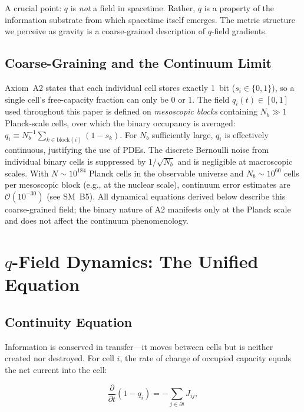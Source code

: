 \documentclass[aps,prd,twocolumn,showpacs,superscriptaddress,preprintnumbers]{revtex4-2}
\begin{document}
A crucial point: $q$ is \emph{not} a field in spacetime.
Rather, $q$ is a property of the information substrate from which spacetime itself emerges.
The metric structure we perceive as gravity is a coarse-grained description of $q$-field gradients.

\subsection{Coarse-Graining and the Continuum Limit}

Axiom~A2 states that each individual cell stores exactly 1~bit ($s_i\in\{0,1\}$), so a single cell's free-capacity fraction can only be 0 or 1.
The field $q_i(t)\in[0,1]$ used throughout this paper is defined on \emph{mesoscopic blocks} containing $N_b\gg 1$ Planck-scale cells, over which the binary occupancy is averaged:
$q_i \equiv N_b^{-1}\sum_{k\in\text{block}(i)}(1-s_k)$.
For $N_b$ sufficiently large, $q_i$ is effectively continuous, justifying the use of PDEs.
The discrete Bernoulli noise from individual binary cells is suppressed by $1/\sqrt{N_b}$ and is negligible at macroscopic scales.
With $N\sim10^{184}$ Planck cells in the observable universe and $N_b\sim10^{60}$ cells per mesoscopic block (e.g., at the nuclear scale), continuum error estimates are $\mathcal{O}(10^{-30})$ (see SM~B5).
All dynamical equations derived below describe this coarse-grained field; the binary nature of A2 manifests only at the Planck scale and does not affect the continuum phenomenology.

\section{$q$-Field Dynamics: The Unified Equation}
\label{sec:dynamics}

\subsection{Continuity Equation}

Information is conserved in transfer---it moves between cells but is neither created nor destroyed.
For cell $i$, the rate of change of occupied capacity equals the net current into the cell:

\begin{equation}
\frac{\partial}{\partial t}(1 - q_i) = -\sum_{j \in \partial i} J_{ij},
\label{eq:continuity_raw}
\end{equation}
\end{document}

